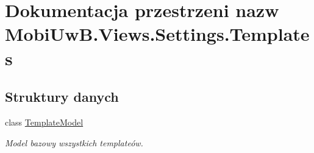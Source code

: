 \hypertarget{a00279}{}\section{Dokumentacja przestrzeni nazw Mobi\+Uw\+B.\+Views.\+Settings.\+Templates}
\label{a00279}
\subsection*{Struktury danych}
\begin{DoxyCompactItemize}
\item 
class \hyperlink{a00070}{Template\+Model}
\begin{DoxyCompactList}\small\item\em Model bazowy wszystkich template\textquotesingle{}ów. \end{DoxyCompactList}\end{DoxyCompactItemize}

